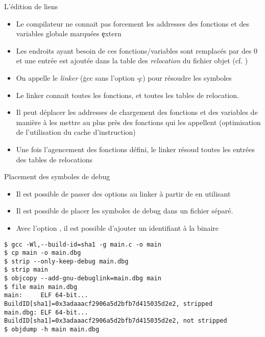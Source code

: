 \begin{frame}[fragile=singleslide]{L'édition de liens}
  \begin{itemize}
  \item  Le compilateur  ne connait  pas forcement  les  addresses des
    fonctions et des variables globale marquées \c{extern}
  \item  Les endroits  ayant  besoin de  ces fonctions/variables  sont
    remplacés par  des 0 et une  entrée est ajoutée dans  la table des
    \emph{relocation} du fichier objet (cf. )
  \item  On appelle  le \emph{linker}  (\c{gcc} sans  l'option \c{-c})
    pour résoudre les symboles
  \item Le linker  connait toutes les fonctions, et  toutes les tables
    de relocation.
  \item Il peut déplacer les  addresses de chargement des fonctions et
    des variables de  manière à les mettre au  plus près des fonctions
    qui  les   appellent  (optimisation  de   l'utilisation  du  cache
    d'instruction)
  \item Une  fois l'agencement des fonctions défini,  le linker résoud
    toutes les entrées des tables de relocations
  \end{itemize}
\end{frame}

\begin{frame}[fragile=singleslide]{Placement des symboles de debug}
  \begin{itemize} 
  \item Il  est possible de passer  des options au linker  à partir de
     en utilisant 
  \item  Il est  possible  de placer  les  symboles de  debug dans  un
    fichier séparé.
  \item Avec l'option , il est possible d'ajouter
    un identifiant à la binaire
  \end{itemize} 
  \begin{lstlisting}
$ gcc -Wl,--build-id=sha1 -g main.c -o main
$ cp main -o main.dbg
$ strip --only-keep-debug main.dbg
$ strip main
$ objcopy --add-gnu-debuglink=main.dbg main
$ file main main.dbg
main:     ELF 64-bit... BuildID[sha1]=0x3adaaacf2906a5d2bfb7d415035d2e2, stripped
main.dbg: ELF 64-bit... BuildID[sha1]=0x3adaaacf2906a5d2bfb7d415035d2e2, not stripped
$ objdump -h main main.dbg
  \end{lstlisting}
\end{frame}

